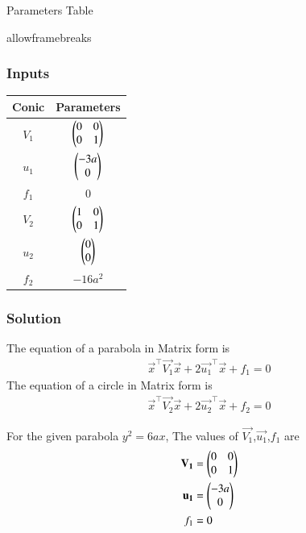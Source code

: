 \documentclass{beamer}
\begin{document}
\begin{frame}{Parameters Table}
    \begin{table}[ht]
    \begin{adjustbox}{width=0.8\framewidth}
       
    \end{adjustbox}
    \vspace{0.5cm}
    \caption{Parameters}
    \label{tab:Gate.ee.54.1}
\end{table}
\end{frame}
\begin{frame}{allowframebreaks}
\frametitle{Inputs}

    \centering
    
    \label{tab:parameters}
	\begin{tabular}[12pt]{ |c| c|}
    \hline
    \textbf{Conic}& \textbf{Parameters}\\ 
    \hline
     $V_1$& $\begin{pmatrix}0 & 0 \\ 0 & 1\end{pmatrix}$\\
    \hline 
     $u_1$& $\begin{pmatrix}-3a\\0\end{pmatrix}$\\
    \hline
     $f_1$& $0$\\
     \hline
     $V_2$& $\begin{pmatrix}1 & 0 \\ 0 & 1\end{pmatrix}$\\
    \hline 
     $u_2$& $\begin{pmatrix}0\\0\end{pmatrix}$\\
    \hline
     $f_2$& $-16a^2$\\
     \hline
    \end{tabular}
\end{frame}
\begin{frame}
\frametitle{Solution}
The equation of a parabola in Matrix form is
\begin{align}
\vec{x}^\top\vec{V_1}\vec{x} + 2\vec{u_1}^\top\vec{x} + f_1 = 0
\end{align}
The equation of a circle in Matrix form is
\begin{align}
\vec{x}^\top\vec{V_2}\vec{x} + 2\vec{u_2}^\top\vec{x} + f_2 = 0
\end{align}

For the given parabola $y^2=6ax$, The values of $\vec{V_1}$,$\vec{u_1}$,$f_1$ are
\begin{align}
\mathbf{V_1}&=\begin{pmatrix}0 & 0\\0 & 1\end{pmatrix}\\
\mathbf{u_1}&=\begin{pmatrix}-3a\\0\end{pmatrix}\\
f_1&=0
\end{align}
\end{frame}
\end{document}
